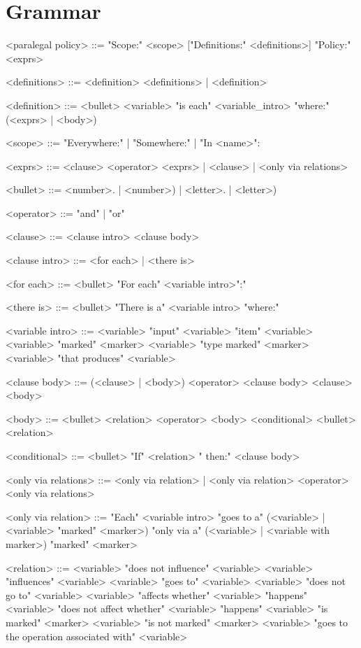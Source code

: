 \appendix
\section{Grammar}
\label{sec:grammar}

\begin{grammar}
<paralegal policy> ::= 
    "Scope:" <scope> 
    ["Definitions:" <definitions>] 
    "Policy:" <exprs>

<definitions> ::= <definition> <definitions> | <definition>

<definition> ::=
	<bullet> <variable> "is each" <variable_intro> "where:" (<exprs> | <body>)

<scope> ::= "Everywhere:" | "Somewhere:" | "In <name>":

<exprs> ::= 
	<clause> <operator> <exprs> |
	<clause> |
	<only via relations>

<bullet> ::= <number>. | <number>) | <letter>. | <letter>)

<operator> ::= "and" | "or"

<clause> ::= <clause intro> <clause body>

<clause intro> ::= <for each> | <there is>

<for each> ::= <bullet> "For each" <variable intro>":"

<there is> ::= <bullet> "There is a" <variable intro> "where:"

<variable intro> ::= <variable> "input"
    \alt <variable> "item"
	\alt <variable>
	\alt <variable> "marked" <marker>
	\alt <variable> "type marked" <marker>
	\alt <variable> "that produces" <variable>

<clause body> ::= (<clause> | <body>) <operator> <clause body> 
	\alt <clause>
	\alt <body>

<body> ::= <bullet> <relation> <operator> <body> 
    \alt <conditional> 
    \alt <bullet> <relation>

<conditional> ::= <bullet> "If" <relation> " then:" <clause body> 

<only via relations> ::= <only via relation> | <only via relation> <operator> <only via relations>

<only via relation> ::= 
	"Each" <variable intro> "goes to a" 
    (<variable> | <variable> "marked" <marker>) 
	"only via a" (<variable> | <variable with marker>)
    "marked" <marker>

<relation> ::= <variable> "does not influence" <variable>
    \alt <variable> "influences" <variable>
	\alt <variable> "goes to" <variable>
	\alt <variable> "does not go to" <variable>
	\alt <variable> "affects whether" <variable> "happens"
	\alt <variable> "does not affect whether" <variable> "happens"
	\alt <variable> "is marked" <marker>
	\alt <variable> "is not marked" <marker>
	\alt <variable> "goes to the operation associated with" <variable>
\end{grammar}
